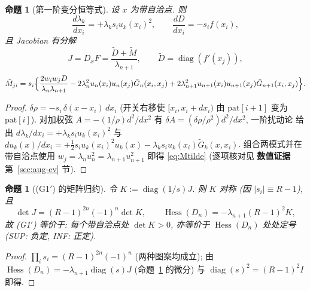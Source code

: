\documentclass[UTF8]{ctexart}
\newtheorem{proposition}[theorem]{命题}
\newcommand{\EVIDENCE}{\textbf{数值证据}}
\begin{document}
\begin{proposition}[第一阶变分恒等式]\label{prop:firstorder}
设 $x$ 为带自洽点. 则
\begin{equation*}
	\frac{d\lambda_k}{dx_i}=+\lambda_k s_i u_k(x_i)^2,\qquad
	\frac{dD}{dx_i}=-s_i f(x_i),
\end{equation*}
且 Jacobian 有分解
\begin{equation*}
	J=D_xF=\frac{\tilde D+\tilde M}{\lambda_{n+1}},\qquad
	\tilde D=\operatorname{diag}(f'(x_j)),
\end{equation*}
\begin{equation}\label{eq:Mtilde}
	\tilde M_{ji}=s_i\Bigl\{
	\frac{2w_iw_jD}{\lambda_n\lambda_{n+1}}
	-2\lambda_n^2u_n(x_i)u_n(x_j)\tilde G_n(x_i,x_j)
	+2\lambda_{n+1}^2u_{n+1}(x_i)u_{n+1}(x_j)\tilde G_{n+1}(x_i,x_j)\Bigr\}.
\end{equation}
\end{proposition}
\begin{proof}
$\delta\rho=-s_i\,\delta(x-x_i)\,dx_i$ (开关右移使 $[x_i,x_i+dx_i)$ 由
$\mathrm{pat}[i+1]$ 变为 $\mathrm{pat}[i]$). 对加权弦
$A=-(1/\rho)d^2/dx^2$ 有 $\delta A=(\delta\rho/\rho^2)d^2/dx^2$, 一阶扰动论
给出 $d\lambda_k/dx_i=+\lambda_ks_iu_k(x_i)^2$ 与
$du_k(x)/dx_i=+\frac12s_iu_k(x_i)^2u_k(x)-\lambda_ks_iu_k(x_i)\tilde G_k(x,x_i)$.
组合两模式并在带自洽点使用 $w_j=\lambda_nu_n^2=\lambda_{n+1}u_{n+1}^2$
即得 \eqref{eq:Mtilde} (逐项核对见 \EVIDENCE 第~\ref{sec:aug-ev} 节).
\end{proof}

\begin{proposition}[(G1$'$) 的矩阵归约]\label{prop:K}
令 $K:=\operatorname{diag}(1/s)J$. 则 $K$ 对称
(因 $|s_i|\equiv R-1$), 且
\begin{equation}\label{eq:detK}
	\det J=(R-1)^{2n}(-1)^n\det K,\qquad
	\operatorname{Hess}(D_n)=-\lambda_{n+1}(R-1)^2K,
\end{equation}
故 (G1$'$) 等价于: 每个带自洽点处 $\det K>0$, 亦等价于
$\operatorname{Hess}(D_n)$ 处处定号 (SUP: 负定, INF: 正定).
\end{proposition}
\begin{proof}
$\prod_is_i=(R-1)^{2n}(-1)^n$ (两种图案均成立); 由
$\operatorname{Hess}(D_n)=-\lambda_{n+1}\operatorname{diag}(s)J$ (命题~\ref{prop:firstorder}
的微分) 与 $\operatorname{diag}(s)^2=(R-1)^2I$ 即得.
\end{proof}
\end{document}
